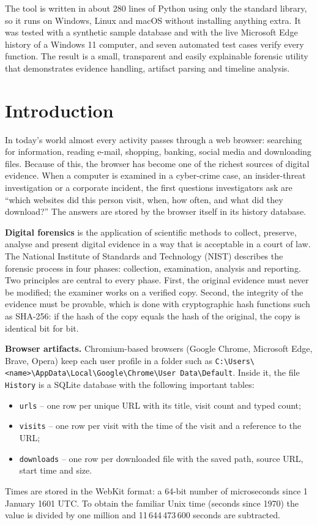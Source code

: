 \documentclass[12pt,a4paper]{article}
\begin{document}
The tool is written in about 280 lines of Python using only the standard library, so it runs on Windows, Linux and macOS without installing anything extra. It was tested with a synthetic sample database and with the live Microsoft Edge history of a Windows 11 computer, and seven automated test cases verify every function. The result is a small, transparent and easily explainable forensic utility that demonstrates evidence handling, artifact parsing and timeline analysis.

\newpage
\section*{Introduction}\label{sec:intro}
In today's world almost every activity passes through a web browser: searching for information, reading e-mail, shopping, banking, social media and downloading files. Because of this, the browser has become one of the richest sources of digital evidence. When a computer is examined in a cyber-crime case, an insider-threat investigation or a corporate incident, the first questions investigators ask are ``which websites did this person visit, when, how often, and what did they download?'' The answers are stored by the browser itself in its history database.

\textbf{Digital forensics} is the application of scientific methods to collect, preserve, analyse and present digital evidence in a way that is acceptable in a court of law. The National Institute of Standards and Technology (NIST) describes the forensic process in four phases: collection, examination, analysis and reporting. Two principles are central to every phase. First, the original evidence must never be modified; the examiner works on a verified copy. Second, the integrity of the evidence must be provable, which is done with cryptographic hash functions such as SHA-256: if the hash of the copy equals the hash of the original, the copy is identical bit for bit.

\textbf{Browser artifacts.} Chromium-based browsers (Google Chrome, Microsoft Edge, Brave, Opera) keep each user profile in a folder such as \texttt{C:\textbackslash Users\textbackslash <name>\textbackslash AppData\textbackslash Local\textbackslash Google\textbackslash Chrome\textbackslash User Data\textbackslash Default}. Inside it, the file \texttt{History} is a SQLite database with the following important tables:
\begin{itemize}[nosep]
  \item \texttt{urls} -- one row per unique URL with its title, visit count and typed count;
  \item \texttt{visits} -- one row per visit with the time of the visit and a reference to the URL;
  \item \texttt{downloads} -- one row per downloaded file with the saved path, source URL, start time and size.
\end{itemize}
Times are stored in the WebKit format: a 64-bit number of microseconds since 1 January 1601 UTC. To obtain the familiar Unix time (seconds since 1970) the value is divided by one million and 11\,644\,473\,600 seconds are subtracted.
\end{document}
